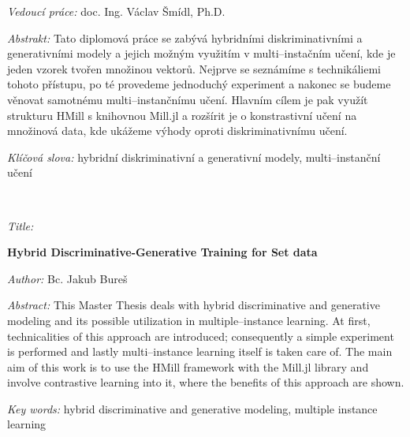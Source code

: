 \bigskip{}

\noindent \emph{Vedoucí práce:} doc. Ing. Václav Šmídl, Ph.D.

\bigskip{}


\noindent \emph{Abstrakt:} Tato diplomová práce se zabývá hybridními diskriminativními a generativními modely a jejich možným využitím v multi--instačním učení, kde je jeden vzorek tvořen množinou vektorů. Nejprve se seznámíme s technikáliemi tohoto přístupu, po té provedeme jednoduchý experiment a nakonec se budeme věnovat samotnému multi--instančnímu učení. Hlavním cílem je pak využít strukturu HMill s knihovnou Mill.jl a rozšírit je o konstrastivní učení na množinová data, kde ukážeme výhody oproti diskriminativnímu učení.

\bigskip{}

\noindent \emph{Klíčová slova:} hybridní diskriminativní a generativní modely, multi--instanční učení

%
\vfill{}
~

\begin{onehalfspace}
\noindent \emph{Title:}

\noindent \textbf{Hybrid Discriminative-Generative Training for Set data}
\end{onehalfspace}

\bigskip{}

\noindent \emph{Author:} Bc. Jakub Bureš

\bigskip{}

\noindent \emph{Abstract:} This Master Thesis deals with hybrid discriminative and generative modeling and its possible utilization in multiple--instance learning. At first, technicalities of this approach are introduced; consequently a simple experiment is performed and lastly multi--instance learning itself is taken care of. The main aim of this work is to use the HMill framework with the Mill.jl library and involve contrastive learning into it, where the benefits of this approach are shown. 

\bigskip{}

\noindent \emph{Key words:} hybrid discriminative and generative modeling, multiple instance learning

\newpage{}

\pagestyle{plain}

\tableofcontents{}

\newpage{}
\pagestyle{headings}